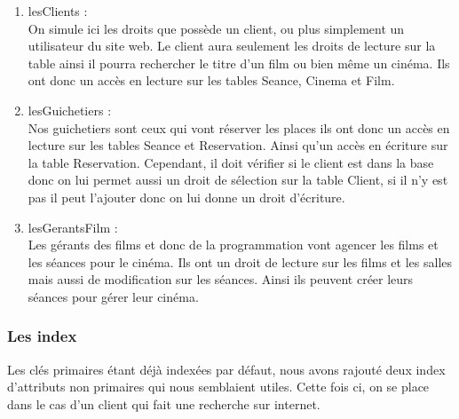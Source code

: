 \documentclass[a4paper,sffamily,12pt]{article}
\begin{document}
					\begin{enumerate}[label=\ding{228}]

						\item lesClients : \\
						
							On simule ici les droits que possède un client, ou plus simplement un utilisateur du site web. Le client aura seulement les droits de lecture sur la table ainsi il pourra rechercher le titre d'un film ou bien même un cinéma. Ils ont donc un accès en lecture sur les tables Seance, Cinema et Film.\\
																		
						\item lesGuichetiers : \\
						
							Nos guichetiers sont ceux qui vont réserver les places ils ont donc un accès en lecture sur les tables Seance et Reservation. Ainsi qu'un accès en écriture sur la table Reservation. Cependant, il doit vérifier si le client est dans la base donc on lui permet aussi un droit de sélection sur la table Client, si il n'y est pas il peut l'ajouter donc on lui donne un droit d'écriture.\\
						
						\item lesGerantsFilm : \\
							
							Les gérants des films et donc de la programmation vont agencer les films et les séances pour le cinéma. Ils ont un droit de lecture sur les films et les salles mais aussi de modification sur les séances. Ainsi ils peuvent créer leurs séances pour gérer leur cinéma.\\
																													
					\end{enumerate}
					
				\subsubsection{Les index}
				
					\vspace{0.5cm}
					
					Les clés primaires étant déjà indexées par défaut, nous avons rajouté deux index d'attributs non primaires qui nous semblaient utiles. Cette fois ci, on se place dans le cas d'un client qui fait une recherche sur internet. \\ 					
					
\end{document}

